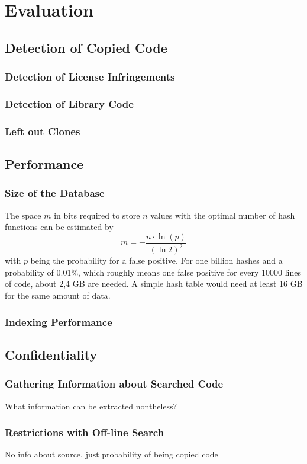 
\chapter{Evaluation}\label{chapter:evaluation}
\section{Detection of Copied Code} %
\subsection{Detection of License Infringements} %
\subsection{Detection of Library Code}
\subsection{Left out Clones}

\section{Performance}
\subsection{Size of the Database}
The space $m$ in bits required to store $n$ values with the optimal number of hash functions can be estimated by 
\begin{equation}\label{equ:bloom_probability} %
m = -\frac{n\cdot \ln(p)}{(\ln2)^{2}}
\end{equation}
with $p$ being the probability for a false positive.
For one billion hashes and a probability of 0.01\%, which roughly means one false positive for every 10000 lines of code, about 2,4 GB are needed.
A simple hash table would need at least 16 GB for the same amount of data.

\subsection{Indexing Performance}

\section{Confidentiality}
\subsection{Gathering Information about Searched Code}
What information can be extracted nontheless?
\subsection{Restrictions with Off-line Search}
No info about source, just probability of being copied code